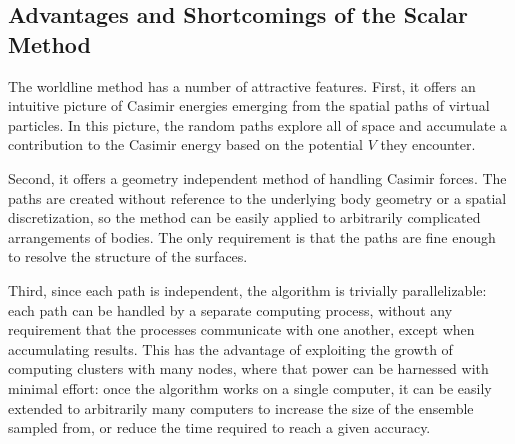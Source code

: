
\subsection[Advantages and Shortcomings of the Scalar \\ Method]{Advantages and Shortcomings of the Scalar Method}

The worldline method has a number of attractive features.  
First, it offers an intuitive picture of Casimir energies emerging from the spatial paths 
of virtual particles.   In this picture, the random paths explore all of space
and accumulate a contribution to the Casimir energy based on the potential $V$ they encounter.

Second, it offers a geometry independent method of handling Casimir forces.  The paths are 
created without reference to the underlying body geometry or a spatial discretization, so the method can be easily applied to arbitrarily
complicated arrangements of bodies.  The only requirement is that the paths are fine enough
to resolve the structure of the surfaces.  

Third, since each path is independent, the algorithm is trivially parallelizable: each path
can be handled by a separate computing process, without any requirement that the processes communicate
with one another, except when accumulating results.  This has the advantage of exploiting the growth of computing clusters with many nodes,
where that power can be harnessed with minimal effort: once the algorithm works on a single computer,
it can be easily extended to arbitrarily many computers to increase the size of the ensemble sampled
from, or reduce the time required to reach a given accuracy.  



